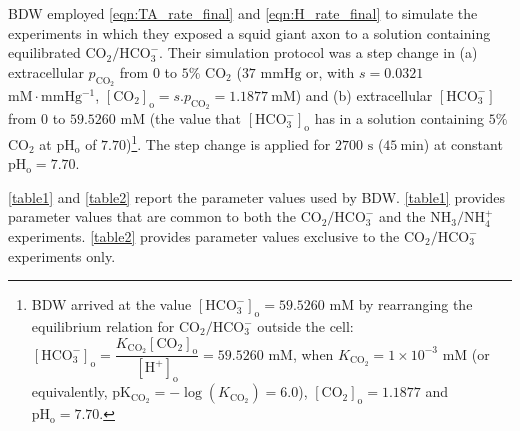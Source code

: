 \documentclass[fleqn,10pt]{physiome}
\begin{document}
BDW employed \autoref{eqn:TA_rate_final} and \autoref{eqn:H_rate_final} to simulate the experiments in which they exposed a squid giant axon to a solution containing equilibrated $\mathrm{CO_2}/\mathrm{HCO_3^-}$. Their simulation protocol was a step change in (a) extracellular $p_\mathrm{CO_2}$ from $0$ to $5\%$ $\mathrm{CO_2}$ ($37$ $\mathrm{mmHg}$ or, with $s=0.0321$ $\mathrm{mM\cdot mmHg^{-1}}$, $\mathrm{[CO_2]_o}=s.p_\mathrm{CO_2}=1.1877~\mathrm{mM}$) and (b) extracellular $\mathrm{[HCO_3^-]}$ from $0$ to $59.5260$ $\mathrm{mM}$ (the value that $\mathrm{[HCO_3^-]_o}$ has in a solution containing $5\%$ $\mathrm{CO_2}$ at $\mathrm{pH_o}$ of $7.70$)\footnote{BDW arrived at the value $\mathrm{[HCO_3^-]_o}= 59.5260$ $\mathrm{mM}$ by rearranging the equilibrium relation for $\mathrm{CO_2}/\mathrm{HCO_3^-}$ outside the cell: $\mathrm{[HCO_3^-]_o}=\dfrac{K_\mathrm{CO_2}\mathrm{[CO_2]_o}}{\mathrm{[H^+]_o}}= 59.5260$ $\mathrm{mM}$, when $K_\mathrm{CO_2}= 1\times 10^{-3}$ $\mathrm{mM}$ (or equivalently, $\mathrm{pK_{CO_2}}=-\log(K_\mathrm{CO_2})=6.0$), $\mathrm{[CO_2]_o}= 1.1877$ and $\mathrm{pH_o}= 7.70$.}. The step change is applied for $2700$ $\mathrm{s}$ ($45~\mathrm{min}$) at constant $\mathrm{pH_o}=7.70$.

\autoref{table1} and \autoref{table2} report the parameter values used by BDW. \autoref{table1} provides parameter values that are common to both the $\mathrm{CO_2}/\mathrm{HCO_3^-}$ and the $\mathrm{NH_3}/\mathrm{NH_4^+}$ experiments. \autoref{table2} provides parameter values exclusive to the $\mathrm{CO_2}/\mathrm{HCO_3^-}$ experiments only.
\end{document}
